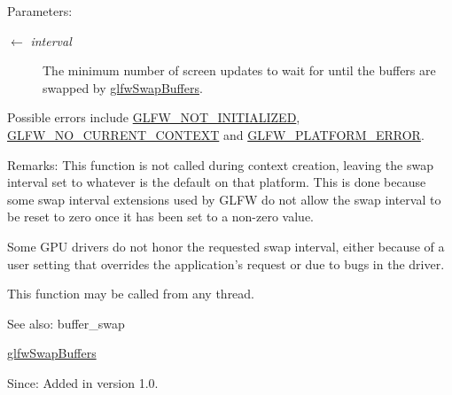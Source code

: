 \begin{Desc}
\item[Parameters:]
\begin{description}
\item[\mbox{$\leftarrow$} {\em interval}]The minimum number of screen updates to wait for until the buffers are swapped by \hyperlink{group__window_gfb827800eedbfcbc97b1e5408df668d7}{glfwSwapBuffers}.\end{description}
\end{Desc}
Possible errors include \hyperlink{group__errors_g2374ee02c177f12e1fa76ff3ed15e14a}{GLFW\_\-NOT\_\-INITIALIZED}, \hyperlink{group__errors_ga8290386e9528ccb9e42a3a4e16fc0d0}{GLFW\_\-NO\_\-CURRENT\_\-CONTEXT} and \hyperlink{group__errors_gd44162d78100ea5e87cdd38426b8c7a1}{GLFW\_\-PLATFORM\_\-ERROR}.

\begin{Desc}
\item[Remarks:]This function is not called during context creation, leaving the swap interval set to whatever is the default on that platform. This is done because some swap interval extensions used by GLFW do not allow the swap interval to be reset to zero once it has been set to a non-zero value.

Some GPU drivers do not honor the requested swap interval, either because of a user setting that overrides the application's request or due to bugs in the driver.\end{Desc}
This function may be called from any thread.

\begin{Desc}
\item[See also:]buffer\_\-swap 

\hyperlink{group__window_gfb827800eedbfcbc97b1e5408df668d7}{glfwSwapBuffers}\end{Desc}
\begin{Desc}
\item[Since:]Added in version 1.0. \end{Desc}
